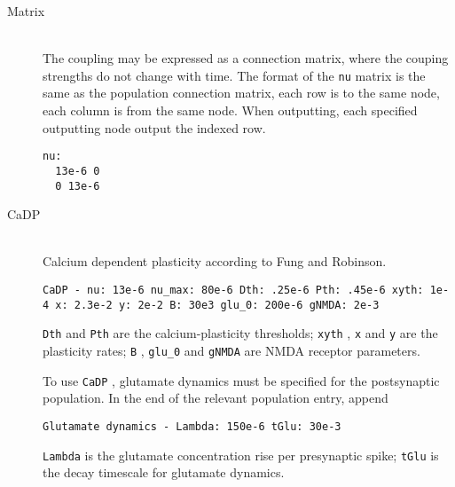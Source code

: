 \documentclass[12pt,a4paper]{article}
\newcommand{\type}[1]{{\small\small\tt #1} }
\begin{document}
\begin{itemize}
\begin{description}

	\item[Matrix]\ \\
	
	The coupling may be expressed as a connection matrix, where the couping
	strengths do not change with time. The format of the \texttt{nu} matrix is
	the same as the population connection matrix, each row is to the same
	node, each column is from the same node. When outputting, each specified
	outputting node output the indexed row.

	\begin{lstlisting}
nu:
  13e-6 0
  0 13e-6
	\end{lstlisting}

	\item[CaDP]\ \\
	Calcium dependent plasticity according to Fung and Robinson.
	\begin{lstlisting}
CaDP - nu: 13e-6 nu_max: 80e-6 Dth: .25e-6 Pth: .45e-6 xyth: 1e-4 x: 2.3e-2 y: 2e-2 B: 30e3 glu_0: 200e-6 gNMDA: 2e-3
	\end{lstlisting}

	\type{Dth} and \type{Pth} are the calcium-plasticity thresholds; \type{xyth}, \type{x} and \type{y} are the plasticity rates; \type{B}, \type{glu\_0} and \type{gNMDA} are NMDA receptor parameters.

	To use \type{CaDP}, glutamate dynamics must be specified for the postsynaptic population. In the end of the relevant population entry, append
	\begin{lstlisting}
Glutamate dynamics - Lambda: 150e-6 tGlu: 30e-3
	\end{lstlisting}
	\type{Lambda} is the glutamate concentration rise per presynaptic spike; \type{tGlu} is the decay timescale for glutamate dynamics.


\end{description}
\end{itemize}
\end{document}
